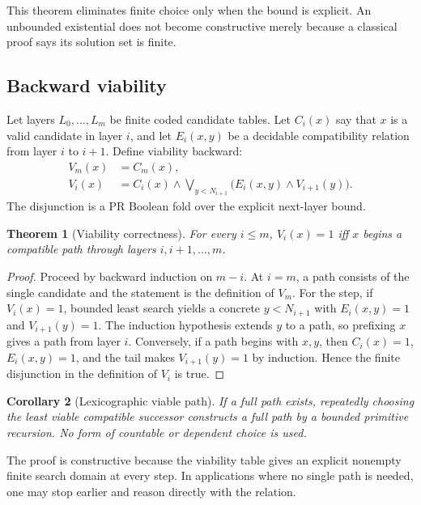 \documentclass[11pt]{article}
\newtheorem{theorem}{Theorem}[section]
\newtheorem{corollary}[theorem]{Corollary}
\begin{document}
This theorem eliminates finite choice only when the bound is explicit.  An
unbounded existential does not become constructive merely because a classical
proof says its solution set is finite.

\subsection{Backward viability}

Let layers \(L_0,\ldots,L_m\) be finite coded candidate tables.  Let
\(C_i(x)\) say that \(x\) is a valid candidate in layer \(i\), and let
\(E_i(x,y)\) be a decidable compatibility relation from layer \(i\) to
\(i+1\).  Define viability backward:
\begin{align*}
 V_m(x)&=C_m(x),\\
 V_i(x)&=C_i(x)\wedge
  \bigvee_{y<N_{i+1}}\bigl(E_i(x,y)\wedge V_{i+1}(y)\bigr).
\end{align*}
The disjunction is a PR Boolean fold over the explicit next-layer bound.

\begin{theorem}[Viability correctness]
\label{thm:viability}
For every \(i\le m\), \(V_i(x)=1\) iff \(x\) begins a compatible path through
layers \(i,i+1,\ldots,m\).
\end{theorem}

\begin{proof}
Proceed by backward induction on \(m-i\).  At \(i=m\), a path consists of the
single candidate and the statement is the definition of \(V_m\).  For the
step, if \(V_i(x)=1\), bounded least search yields a concrete \(y<N_{i+1}\)
with \(E_i(x,y)=1\) and \(V_{i+1}(y)=1\).  The induction hypothesis extends
\(y\) to a path, so prefixing \(x\) gives a path from layer \(i\).  Conversely,
if a path begins with \(x,y\), then \(C_i(x)=1\), \(E_i(x,y)=1\), and the tail
makes \(V_{i+1}(y)=1\) by induction.  Hence the finite disjunction in the
definition of \(V_i\) is true.
\end{proof}

\begin{corollary}[Lexicographic viable path]
\label{cor:lex-path}
If a full path exists, repeatedly choosing the least viable compatible
successor constructs a full path by a bounded primitive recursion.  No form of
countable or dependent choice is used.
\end{corollary}

The proof is constructive because the viability table gives an explicit
nonempty finite search domain at every step.  In applications where no single
path is needed, one may stop earlier and reason directly with the relation.
\end{document}
